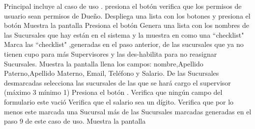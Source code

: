 	\begin{UCtrayectoria}{Principal}
		\UCpaso incluye al caso de uso .
		\UCpaso [\UCactor] presiona el botón 
		\UCpaso verifica que los permisos de usuario sean permisos de Dueño. 
		\UCpaso Despliega una lista con los botones  y 
		\UCpaso [\UCactor] presiona el botón 
		\UCpaso Muestra la pantalla 
		\UCpaso [\UCactor] Presiona el botón 
		\UCpaso Genera una lista con los nombres de las Sucursales que hay están en el sistema y la muestra en  como una ``checklist"
		\UCpaso Marca las ``checklist" ,generadas en el paso anterior, de las sucursales que ya no tienen cupo para más Supervisores y las des-habilita para no reasignar Sucursales. 	 	 
		\UCpaso Muestra la pantalla 
		\UCpaso [\UCactor] llena los campos: nombre,Apellido Paterno,Apellido Materno, Email, Teléfono y Salario.
		\UCpaso [\UCactor] De las Sucursales desmarcadas selecciona las sucursales de las que se hará cargo el supervisor (máximo 3 mínimo 1)
		\UCpaso [\UCactor] Presiona el botón .
		\UCpaso Verifica que ningún campo del formulario este vació 
		\UCpaso Verifica que el salario sea un dígito.
		\UCpaso Verifica que por lo menos este marcada una Sucursal más de las Sucursales marcadas generadas en el paso 9 de este caso de uso.
		\UCpaso Muestra la pantalla 
	\end{UCtrayectoria}

